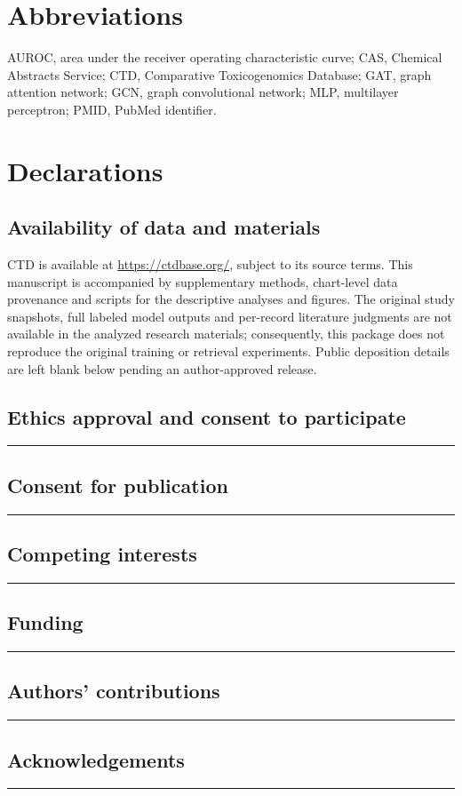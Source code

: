 \section*{Abbreviations}
AUROC, area under the receiver operating characteristic curve; CAS, Chemical Abstracts Service; CTD, Comparative Toxicogenomics Database; GAT, graph attention network; GCN, graph convolutional network; MLP, multilayer perceptron; PMID, PubMed identifier.

\section*{Declarations}
\subsection*{Availability of data and materials}
CTD is available at \url{https://ctdbase.org/}, subject to its source terms. This manuscript is accompanied by supplementary methods, chart-level data provenance and scripts for the descriptive analyses and figures. The original study snapshots, full labeled model outputs and per-record literature judgments are not available in the analyzed research materials; consequently, this package does not reproduce the original training or retrieval experiments. Public deposition details are left blank below pending an author-approved release.
\subsection*{Ethics approval and consent to participate}
\rule{0.95\linewidth}{0.3pt}
\subsection*{Consent for publication}
\rule{0.95\linewidth}{0.3pt}
\subsection*{Competing interests}
\rule{0.95\linewidth}{0.3pt}
\subsection*{Funding}
\rule{0.95\linewidth}{0.3pt}
\subsection*{Authors' contributions}
\rule{0.95\linewidth}{0.3pt}
\subsection*{Acknowledgements}
\rule{0.95\linewidth}{0.3pt}



